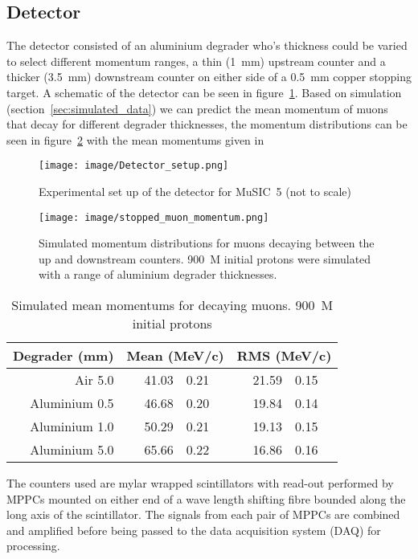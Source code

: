 \documentclass[]{article}
\begin{document}
\subsection{Detector} %
\label{sub:detector}
The detector consisted of an aluminium degrader who's thickness could be varied to select different momentum ranges, a thin (1~mm) upstream counter and a thicker (3.5~mm) downstream counter on either side of a 0.5~mm copper stopping target. A schematic of the detector can be seen in figure~\ref{fig:setup}. Based on simulation (section~\ref{sec:simulated_data}) we can predict the mean momentum of muons that decay for different degrader thicknesses, the momentum distributions can be seen in figure~\ref{fig:stopped_muon_mom} with the mean momentums given in 
\begin{figure}[htbp]
	\centering
		\texttt{[image: image/Detector\_setup.png]}
	\caption{Experimental set up of the detector for MuSIC~5 (not to scale)}
	\label{fig:setup}
\end{figure}  
\begin{figure}[htbp]
	\centering
		\texttt{[image: image/stopped\_muon\_momentum.png]}
	\caption{Simulated momentum distributions for muons decaying between the up and downstream counters. 900~M initial protons were simulated with a range of aluminium degrader thicknesses.}
	\label{fig:stopped_muon_mom}
\end{figure}
\begin{table}
	\begin{center}
	\begin{tabular}{r|r@{ $\pm$ }l|r@{ $\pm$ }l} %
		Degrader (mm) & \multicolumn{2}{|c|}{Mean (MeV/c)} & \multicolumn{2}{|c}{RMS (MeV/c)}\\
		\hline
		Air 5.0       & 41.03 & 0.21 & 21.59 & 0.15 \\
		Aluminium 0.5 & 46.68 & 0.20 & 19.84 & 0.14 \\
		Aluminium 1.0 & 50.29 & 0.21 & 19.13 & 0.15 \\
		Aluminium 5.0 & 65.66 & 0.22 & 16.86 & 0.16 \\
	\end{tabular}
	\end{center}
	\caption{Simulated mean momentums for decaying muons. 900~M initial protons}
	\label{label}
\end{table}
The counters used are mylar wrapped scintillators with read-out performed by MPPCs mounted on either end of a wave length shifting fibre bounded along the long axis of the scintillator. The signals from each pair of MPPCs are combined and amplified before being passed to the data acquisition system (DAQ) for processing.
\end{document}
